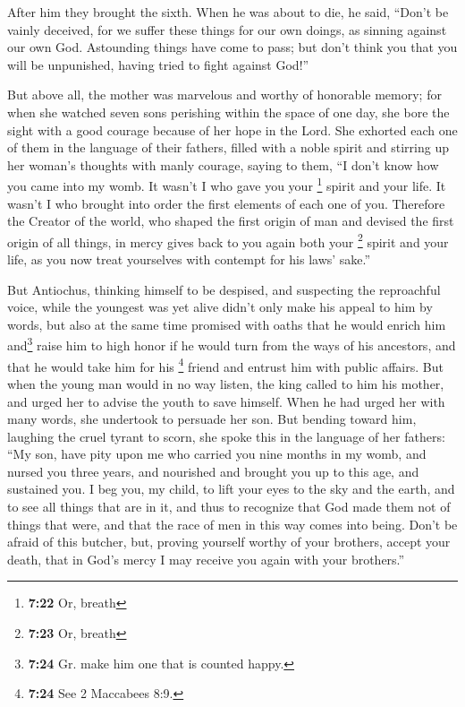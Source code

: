  After him they brought the sixth. When he was about to
die, he said, ``Don't be vainly deceived, for we suffer these things for
our own doings, as sinning against our own God. Astounding things have
come to pass;  but don't think you that you will be
unpunished, having tried to fight against God!''

 But above all, the mother was marvelous and worthy of
honorable memory; for when she watched seven sons perishing within the
space of one day, she bore the sight with a good courage because of her
hope in the Lord.  She exhorted each one of them in the
language of their fathers, filled with a noble spirit and stirring up
her woman's thoughts with manly courage, saying to them, 
``I don't know how you came into my womb. It wasn't I who gave you your
\footnote{\textbf{7:22} Or, breath} spirit and your life. It wasn't I
who brought into order the first elements of each one of you.
 Therefore the Creator of the world, who shaped the first
origin of man and devised the first origin of all things, in mercy gives
back to you again both your \footnote{\textbf{7:23} Or, breath} spirit
and your life, as you now treat yourselves with contempt for his laws'
sake.''

 But Antiochus, thinking himself to be despised, and
suspecting the reproachful voice, while the youngest was yet alive
didn't only make his appeal to him by words, but also at the same time
promised with oaths that he would enrich him and\footnote{\textbf{7:24}
  Gr. make him one that is counted happy.} raise him to high honor if he
would turn from the ways of his ancestors, and that he would take him
for his \footnote{\textbf{7:24} See 2 Maccabees 8:9.} friend and entrust
him with public affairs.  But when the young man would in
no way listen, the king called to him his mother, and urged her to
advise the youth to save himself.  When he had urged her
with many words, she undertook to persuade her son.  But
bending toward him, laughing the cruel tyrant to scorn, she spoke this
in the language of her fathers: ``My son, have pity upon me who carried
you nine months in my womb, and nursed you three years, and nourished
and brought you up to this age, and sustained you.  I beg
you, my child, to lift your eyes to the sky and the earth, and to see
all things that are in it, and thus to recognize that God made them not
of things that were, and that the race of men in this way comes into
being.  Don't be afraid of this butcher, but, proving
yourself worthy of your brothers, accept your death, that in God's mercy
I may receive you again with your brothers.''

